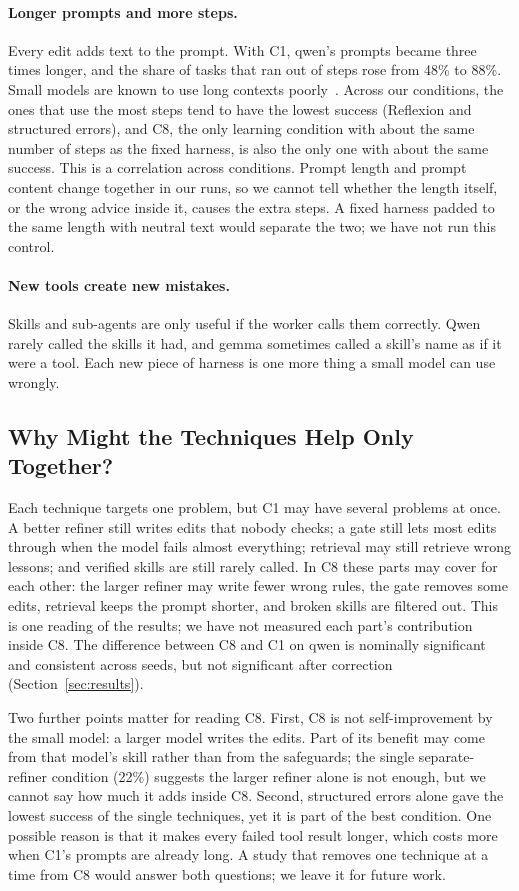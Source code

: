 \paragraph{Longer prompts and more steps.}
Every edit adds text to the prompt. With C1, qwen's prompts became three times longer, and the share
of tasks that ran out of steps rose from 48\% to 88\%. Small models are known to use long contexts
poorly~\cite{liu2024lost}. Across our conditions, the ones that use the most steps tend to have the
lowest success (Reflexion and structured errors), and C8, the only learning condition with about the
same number of steps as the fixed harness, is also the only one with about the same success. This
is a correlation across conditions. Prompt length and prompt content change together in our runs,
so we cannot tell whether the length itself, or the wrong advice inside it, causes the extra steps.
A fixed harness padded to the same length with neutral text would separate the two; we have not
run this control.

\paragraph{New tools create new mistakes.}
Skills and sub-agents are only useful if the worker calls them correctly. Qwen rarely called the
skills it had, and gemma sometimes called a skill's name as if it were a tool. Each new piece of
harness is one more thing a small model can use wrongly.

\subsection{Why Might the Techniques Help Only Together?}

Each technique targets one problem, but C1 may have several problems at once. A better refiner
still writes edits that nobody checks; a gate still lets most edits through when the model fails
almost everything; retrieval may still retrieve wrong lessons; and verified skills are still rarely
called. In C8 these parts may cover for each other: the larger refiner may write fewer wrong rules,
the gate removes some edits, retrieval keeps the prompt shorter, and broken skills are filtered
out. This is one reading of the results; we have not measured each part's contribution inside C8.
The difference between C8 and C1 on qwen is nominally significant and consistent across seeds, but
not significant after correction (Section~\ref{sec:results}).

Two further points matter for reading C8. First, C8 is not self-improvement by the small model: a
larger model writes the edits. Part of its benefit may come from that model's skill rather than from
the safeguards; the single separate-refiner condition (22\%) suggests the larger refiner alone is
not enough, but we cannot say how much it adds inside C8. Second, structured errors alone gave the
lowest success of the single techniques, yet it is part of the best condition. One possible reason
is that it makes every failed tool result longer, which costs more when C1's prompts are already
long. A study that removes one technique at a time from C8 would answer both questions; we leave it
for future work.

